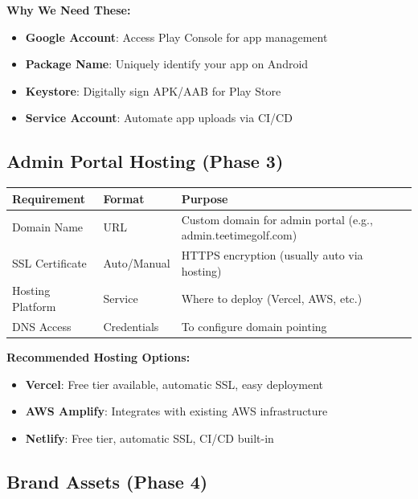 \documentclass[11pt,a4paper]{article}
\begin{document}
\vspace{0.3cm}
\textbf{Why We Need These:}
\begin{itemize}[label=\faCheckCircle]
\item \textbf{Google Account}: Access Play Console for app management
\item \textbf{Package Name}: Uniquely identify your app on Android
\item \textbf{Keystore}: Digitally sign APK/AAB for Play Store
\item \textbf{Service Account}: Automate app uploads via CI/CD
\end{itemize}


\subsection{Admin Portal Hosting (Phase 3)}

\begin{tabularx}{\textwidth}{|p{4cm}|p{3cm}|Y|}
\hline
{}
\textbf{Requirement} & \textbf{Format} & \textbf{Purpose} \\
\hline
Domain Name & URL & Custom domain for admin portal (e.g., admin.teetimegolf.com) \\
\hline
SSL Certificate & Auto/Manual & HTTPS encryption (usually auto via hosting) \\
\hline
Hosting Platform & Service & Where to deploy (Vercel, AWS, etc.) \\
\hline
DNS Access & Credentials & To configure domain pointing \\
\hline
\end{tabularx}

\vspace{0.3cm}
\textbf{Recommended Hosting Options:}
\begin{itemize}
\item \textbf{Vercel}: Free tier available, automatic SSL, easy deployment
\item \textbf{AWS Amplify}: Integrates with existing AWS infrastructure
\item \textbf{Netlify}: Free tier, automatic SSL, CI/CD built-in
\end{itemize}


\subsection{Brand Assets (Phase 4)}
\end{document}
